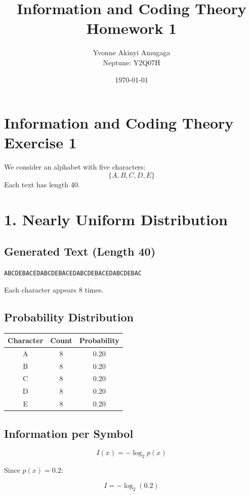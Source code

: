 \documentclass[12pt,oneside]{report}
\title{Information and Coding Theory Homework 1}
\author{Yvonne Akinyi Amugaga \\ Neptune: Y2Q07H}
\date{\today}
\begin{document}
\maketitle

\section*{Information and Coding Theory Exercise 1}

We consider an alphabet with five characters:
\[
\{A, B, C, D, E\}
\]
Each text has length 40.

\section*{1. Nearly Uniform Distribution}

\subsection*{Generated Text (Length 40)}

\texttt{ABCDEBACEDABCDEBACEDABCDEBACEDABCDEBAC}

Each character appears 8 times.

\subsection*{Probability Distribution}

\begin{center}
\begin{tabular}{ccc}
\toprule
Character & Count & Probability \\
\midrule
A & 8 & 0.20 \\
B & 8 & 0.20 \\
C & 8 & 0.20 \\
D & 8 & 0.20 \\
E & 8 & 0.20 \\
\bottomrule
\end{tabular}
\end{center}

\subsection*{Information per Symbol}

\[
I(x) = -\log_2 p(x)
\]

Since $p(x) = 0.2$:

\[
I = -\log_2(0.2)
\]
\end{document}
